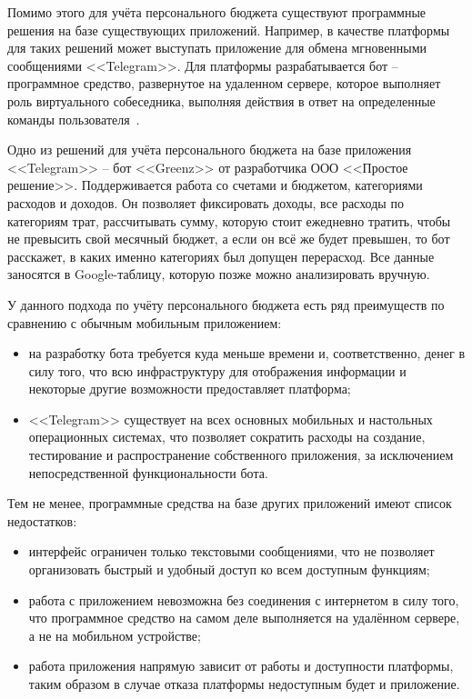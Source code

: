 Помимо этого для учёта персонального бюджета существуют программные решения на базе существующих приложений.
Например, в качестве платформы для таких решений может выступать приложение для обмена мгновенными сообщениями <<Telegram>>.
Для платформы разрабатывается бот -- программное средство, развернутое на удаленном сервере, которое выполняет роль виртуального собеседника, выполняя действия в ответ на определенные команды пользователя~\cite{telegram_bots}.

Одно из решений для учёта персонального бюджета на базе приложения <<Telegram>> -- бот <<Greenz>> от разработчика ООО <<Простое решение>>.
Поддерживается работа со счетами и бюджетом, категориями расходов и доходов.
Он позволяет фиксировать доходы, все расходы по категориям трат, рассчитывать сумму, которую стоит ежедневно тратить, чтобы не превысить свой месячный бюджет, а если он всё же будет превышен, то бот расскажет, в каких именно категориях был допущен перерасход.
Все данные заносятся в Google-таблицу, которую позже можно анализировать вручную.

У данного подхода по учёту персонального бюджета есть ряд преимуществ по сравнению с обычным мобильным приложением:
\begin{itemize}
    \item на разработку бота требуется куда меньше времени и, соответственно, денег в силу того, что всю инфраструктуру для отображения информации и некоторые другие возможности предоставляет платформа;
    \item <<Telegram>> существует на всех основных мобильных и настольных операционных системах, что позволяет сократить расходы на создание, тестирование и распространение собственного приложения, за исключением непосредственной функциональности бота.
\end{itemize}

Тем не менее, программные средства на базе других приложений имеют список недостатков:
\begin{itemize}
    \item интерфейс ограничен только текстовыми сообщениями, что не позволяет организовать быстрый и удобный доступ ко всем доступным функциям;
    \item работа с приложением невозможна без соединения с интернетом в силу того, что программное средство на самом деле выполняется на удалённом сервере, а не на мобильном устройстве;
    \item работа приложения напрямую зависит от работы и доступности платформы, таким образом в случае отказа платформы недоступным будет и приложение.
\end{itemize}


